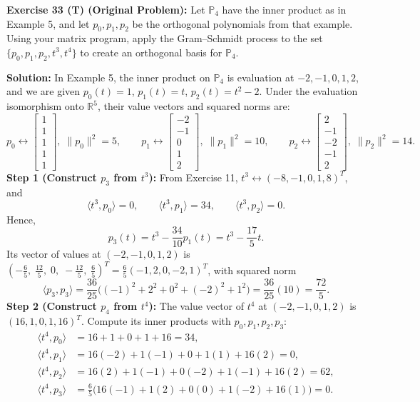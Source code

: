 \documentclass[11pt, letterpaper]{article}
\theoremstyle{definition}
\theoremstyle{remark}
\begin{document}
\textbf{Exercise 33 (T) (Original Problem):} Let $\mathbb{P}_4$ have the inner product as in Example 5, and let $p_0, p_1, p_2$ be the orthogonal polynomials from that example. Using your matrix program, apply the Gram--Schmidt process to the set $\{p_0, p_1, p_2, t^3, t^4\}$ to create an orthogonal basis for $\mathbb{P}_4$.

\textbf{Solution:}
In Example 5, the inner product on $\mathbb{P}_4$ is evaluation at $-2, -1, 0, 1, 2$, and we are given $p_0(t) = 1$, $p_1(t) = t$, $p_2(t) = t^2 - 2$. Under the evaluation isomorphism onto $\mathbb{R}^5$, their value vectors and squared norms are:
\[
    p_0 \leftrightarrow \begin{bmatrix} 1 \\ 1 \\ 1 \\ 1 \\ 1 \end{bmatrix},\; \|p_0\|^2 = 5, \qquad
    p_1 \leftrightarrow \begin{bmatrix} -2 \\ -1 \\ 0 \\ 1 \\ 2 \end{bmatrix},\; \|p_1\|^2 = 10, \qquad
    p_2 \leftrightarrow \begin{bmatrix} 2 \\ -1 \\ -2 \\ -1 \\ 2 \end{bmatrix},\; \|p_2\|^2 = 14.
\]
\textbf{Step 1 (Construct $p_3$ from $t^3$):} From Exercise 11, $t^3 \leftrightarrow (-8, -1, 0, 1, 8)^T$, and
\[
    \langle t^3, p_0 \rangle = 0, \qquad \langle t^3, p_1 \rangle = 34, \qquad \langle t^3, p_2 \rangle = 0.
\]
Hence,
\[
    p_3(t) = t^3 - \frac{34}{10}p_1(t) = t^3 - \frac{17}{5}t.
\]
Its vector of values at $(-2, -1, 0, 1, 2)$ is $\left(-\frac{6}{5},\; \frac{12}{5},\; 0,\; -\frac{12}{5},\; \frac{6}{5}\right)^T = \frac{6}{5}(-1, 2, 0, -2, 1)^T$, with squared norm
\[
    \langle p_3, p_3 \rangle = \frac{36}{25}\bigl((-1)^2 + 2^2 + 0^2 + (-2)^2 + 1^2\bigr) = \frac{36}{25}(10) = \frac{72}{5}.
\]
\textbf{Step 2 (Construct $p_4$ from $t^4$):} The value vector of $t^4$ at $(-2, -1, 0, 1, 2)$ is $(16, 1, 0, 1, 16)^T$. Compute its inner products with $p_0, p_1, p_2, p_3$:
\begin{align*}
    \langle t^4, p_0 \rangle &= 16 + 1 + 0 + 1 + 16 = 34, \\
    \langle t^4, p_1 \rangle &= 16(-2) + 1(-1) + 0 + 1(1) + 16(2) = 0, \\
    \langle t^4, p_2 \rangle &= 16(2) + 1(-1) + 0(-2) + 1(-1) + 16(2) = 62, \\
    \langle t^4, p_3 \rangle &= \frac{6}{5}\bigl(16(-1) + 1(2) + 0(0) + 1(-2) + 16(1)\bigr) = 0.
\end{align*}
\end{document}
